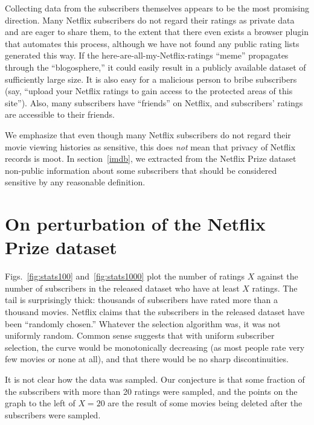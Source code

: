 \documentclass[11pt]{article}
\begin{document}
\begin{appendix}
Collecting data from the subscribers themselves appears to be the most
promising direction.  Many Netflix subscribers do not regard their
ratings as private data and are eager to share them, to the extent
that there even exists a browser plugin that automates this process,
although we have not found any public rating lists generated this way.
If the here-are-all-my-Netflix-ratings ``meme'' propagates through the
``blogosphere,'' it could easily result in a publicly available dataset of
sufficiently large size.  It is also easy for a malicious person to bribe
subscribers (say, ``upload your Netflix ratings to gain access to the
protected areas of this site'').  Also, many subscribers have ``friends''
on Netflix, and subscribers' ratings are accessible to their friends.

We emphasize that even though many Netflix subscribers do not regard
their movie viewing histories as sensitive, this does \emph{not} mean
that privacy of Netflix records is moot.  In section~\ref{imdb}, we
extracted from the Netflix Prize dataset non-public information about
some subscribers that should be considered sensitive by any reasonable
definition.


\section{On perturbation of the Netflix Prize dataset}
\label{liars}

Figs.~\ref{fig:stats100} and~\ref{fig:stats1000} plot the number of
ratings $X$ against the number of subscribers in the released dataset who
have at least $X$ ratings.  The tail is surprisingly thick: thousands of
subscribers have rated more than a thousand movies.  Netflix claims that
the subscribers in the released dataset have been ``randomly chosen.''
Whatever the selection algorithm was, it was not uniformly random.
Common sense suggests that with uniform subscriber selection, the curve
would be monotonically decreasing (as most people rate very few movies
or none at all), and that there would be no sharp discontinuities.

It is not clear how the data was sampled.  Our conjecture is that some
fraction of the subscribers with more than 20 ratings were sampled,
and the points on the graph to the left of $X=20$ are the result of some
movies being deleted after the subscribers were sampled.


\end{appendix}
\end{document}
